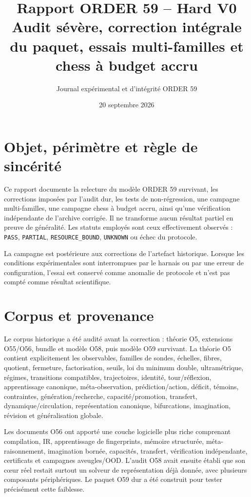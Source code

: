 \documentclass[11pt,a4paper]{article}
\title{Rapport ORDER 59 -- Hard V0\vspace{0.4em}\\\large Audit sévère, correction intégrale du paquet, essais multi-familles et chess à budget accru}
\author{Journal expérimental et d'intégrité ORDER 59}
\date{20 septembre 2026}
\begin{document}
\maketitle

\section{Objet, périmètre et règle de sincérité}
Ce rapport documente la relecture du modèle ORDER 59 survivant, les corrections imposées par l'audit dur, les tests de non-régression, une campagne multi-familles, une campagne chess à budget accru, ainsi qu'une vérification indépendante de l'archive corrigée. Il ne transforme aucun résultat partiel en preuve de généralité. Les statuts employés sont ceux effectivement observés : \texttt{PASS}, \texttt{PARTIAL}, \texttt{RESOURCE\_BOUND}, \texttt{UNKNOWN} ou échec du protocole.

La campagne est postérieure aux corrections de l'artefact historique. Lorsque les conditions expérimentales sont interrompues par le harnais ou par une erreur de configuration, l'essai est conservé comme anomalie de protocole et n'est pas compté comme résultat scientifique.

\section{Corpus et provenance}
Le corpus historique a été audité avant la correction : théorie O5, extensions O55/O56, bundle et modèle O58, puis modèle O59 survivant. La théorie O5 contient explicitement les observables, familles de sondes, échelles, fibres, quotient, fermeture, factorisation, seuils, loi du minimum double, ultramétrique, régimes, transitions compatibles, trajectoires, identité, tour/réflexion, apprentissage canonique, méta-observation, prédiction/action, déficit, témoins, contraintes, génération/recherche, capacité/promotion, transfert, dynamique/circulation, représentation canonique, bifurcations, imagination, révision et généralisation globale.

Les documents O56 ont apporté une couche logicielle plus riche comprenant compilation, IR, apprentissage de fingerprints, mémoire structurée, méta-raisonnement, imagination bornée, capacités, transfert, vérification indépendante, certificats et campagnes aveugles/OOD. L'audit O58 avait ensuite établi que son cœur réel restait surtout un solveur de représentation déjà donnée, avec plusieurs composants périphériques. Le paquet O59 dur a été construit pour tester précisément cette faiblesse.
\end{document}
